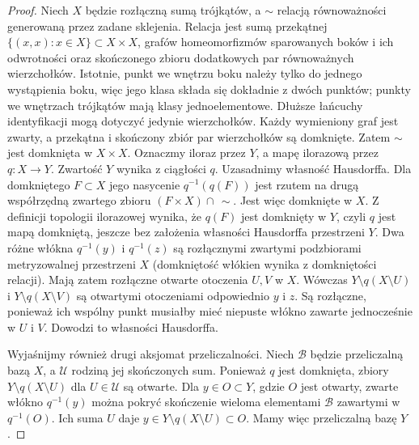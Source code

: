 \begin{proof}
Niech $X$ będzie rozłączną sumą trójkątów,
a $\sim$ relacją równoważności generowaną
przez zadane sklejenia. Relacja jest sumą
przekątnej $\{(x,x):x\in X\}\subset X\times X$,
grafów homeomorfizmów
sparowanych boków i ich odwrotności oraz
skończonego zbioru dodatkowych par równoważnych
wierzchołków. Istotnie, punkt we wnętrzu boku
należy tylko do jednego wystąpienia boku, więc
jego klasa składa się dokładnie z dwóch punktów;
punkty we wnętrzach trójkątów mają klasy
jednoelementowe. Dłuższe łańcuchy identyfikacji
mogą dotyczyć jedynie wierzchołków.
Każdy wymieniony graf jest zwarty, a przekątna
i skończony zbiór par wierzchołków są domknięte.
Zatem $\sim$ jest domknięta w $X\times X$.
Oznaczmy iloraz przez $Y$, a mapę ilorazową przez
$q:X\to Y$. Zwartość $Y$ wynika z ciągłości $q$.
Uzasadnimy własność Hausdorffa. Dla domkniętego
$F\subset X$ jego nasycenie $q^{-1}(q(F))$ jest
rzutem na drugą współrzędną zwartego zbioru
$(F\times X)\cap\,\sim$. Jest więc domknięte w $X$.
Z definicji topologii ilorazowej wynika, że
$q(F)$ jest domknięty w $Y$, czyli $q$ jest mapą
domkniętą, jeszcze bez założenia własności
Hausdorffa przestrzeni $Y$.
Dwa różne włókna $q^{-1}(y)$ i $q^{-1}(z)$ są
rozłącznymi zwartymi podzbiorami metryzowalnej
przestrzeni $X$ (domkniętość włókien wynika
z domkniętości relacji). Mają zatem rozłączne
otwarte otoczenia $U,V$ w $X$. Wówczas
$Y\setminus q(X\setminus U)$ i
$Y\setminus q(X\setminus V)$ są otwartymi
otoczeniami odpowiednio $y$ i $z$.
Są rozłączne, ponieważ ich wspólny punkt
musiałby mieć niepuste włókno zawarte jednocześnie
w $U$ i $V$. Dowodzi to własności Hausdorffa.

Wyjaśnijmy również drugi aksjomat przeliczalności.
Niech $\mathcal B$ będzie przeliczalną bazą $X$,
a $\mathcal U$ rodziną jej skończonych sum.
Ponieważ $q$ jest domknięta,
zbiory $Y\setminus q(X\setminus U)$ dla
$U\in\mathcal U$ są otwarte.
Dla $y\in O\subset Y$, gdzie $O$ jest otwarty,
zwarte włókno $q^{-1}(y)$ można pokryć skończenie
wieloma elementami $\mathcal B$ zawartymi w $q^{-1}(O)$.
Ich suma $U$ daje
$y\in Y\setminus q(X\setminus U)\subset O$.
Mamy więc przeliczalną bazę $Y$.


\end{proof}
